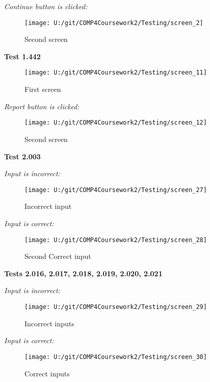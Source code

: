 \textit{Continue button is clicked: }

\begin{figure}[H]
    \label{fig: Second Screen}\caption{Second screen}
    \texttt{[image: U:/git/COMP4Coursework2/Testing/screen\_2]}
\end{figure}

\textbf{Test 1.442}

\begin{figure}[H]
    \label{fig: First Screen}\caption{First screen}
    \texttt{[image: U:/git/COMP4Coursework2/Testing/screen\_11]}
\end{figure}

\textit{Report button is clicked: }

\begin{figure}[H]
    \label{fig: Second Screen}\caption{Second screen}
    \texttt{[image: U:/git/COMP4Coursework2/Testing/screen\_12]}
\end{figure}

\textbf{Test 2.003}

\textit{Input is incorrect: }

\begin{figure}[H]
    \label{fig: Second Screen}\caption{Incorrect input}
    \texttt{[image: U:/git/COMP4Coursework2/Testing/screen\_27]}
\end{figure}

\textit{Input is correct: }

\begin{figure}[H]
    \label{fig: Second Screen}\caption{Second Correct input}
    \texttt{[image: U:/git/COMP4Coursework2/Testing/screen\_28]}
\end{figure}

\textbf{Tests 2.016, 2.017, 2.018, 2.019, 2.020, 2.021}

\textit{Input is incorrect: }

\begin{figure}[H]
    \label{fig: Second Screen}\caption{Incorrect inputs}
    \texttt{[image: U:/git/COMP4Coursework2/Testing/screen\_29]}
\end{figure}

\textit{Input is correct: }

\begin{figure}[H]
    \label{fig: Second Screen}\caption{Correct inputs}
    \texttt{[image: U:/git/COMP4Coursework2/Testing/screen\_30]}
\end{figure}

